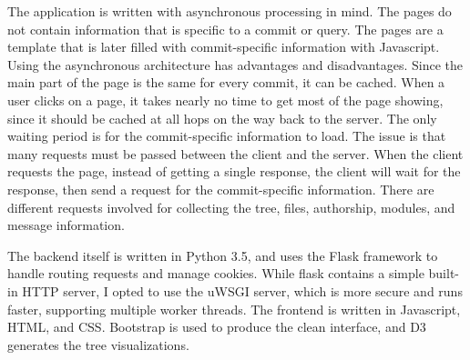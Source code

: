 The application is written with asynchronous processing in mind.
The pages do not contain information that is specific to a commit or
query.
The pages are a template that is later filled with commit-specific
information with Javascript.
Using the asynchronous architecture has advantages and disadvantages.
Since the main part of the page is the same for every commit,
it can be cached.
When a user clicks on a page, it takes nearly no time to get most of
the page showing, since it should be cached at all hops on the way back
to the server.
The only waiting period is for the commit-specific information to load.
The issue is that many requests must be passed between the client and
the server.
When the client requests the page, instead of getting a single
response, the client will wait for the response, then send a request
for the commit-specific information.
There are different requests involved for collecting the tree, files,
authorship, modules, and message information.

The backend itself is written in Python 3.5, and uses the Flask
framework to handle routing requests and manage cookies. While flask
contains a simple built-in HTTP server, I opted to use the uWSGI server,
which is more secure and runs faster, supporting multiple worker
threads. The frontend is written in Javascript, HTML, and CSS. Bootstrap
is used to produce the clean interface, and D3 generates the tree
visualizations.

